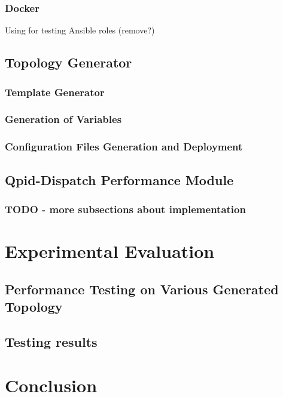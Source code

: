 \subsection{Docker}
Using for testing Ansible roles (remove?)

\section{Topology Generator}

\subsection{Template Generator}

\subsection{Generation of Variables}

\subsection{Configuration Files Generation and Deployment}

\section{Qpid-Dispatch Performance Module}

\subsection{TODO - more subsections about implementation}

\chapter{Experimental Evaluation}
\label{Experimental Evaluation}

\section{Performance Testing on Various Generated Topology}

\section{Testing results}

\chapter{Conclusion}
\label{Conclusion}
